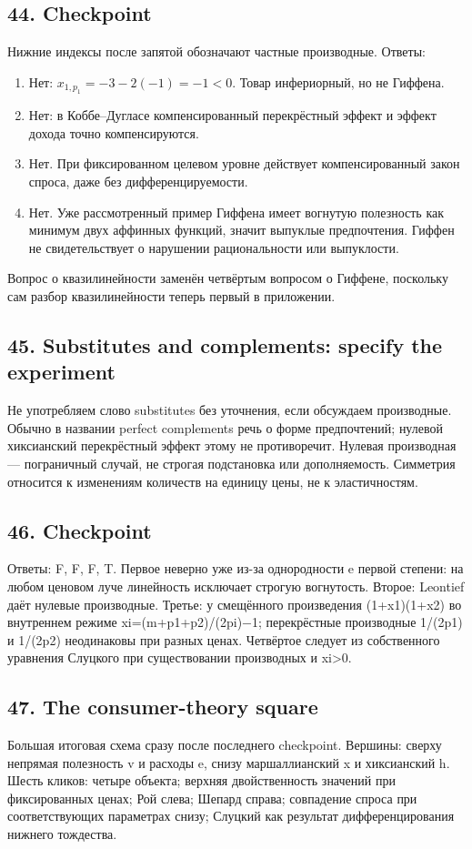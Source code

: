 \documentclass[11pt,a4paper]{article}
\begin{document}
\subsection*{44. Checkpoint}
Нижние индексы после запятой обозначают частные производные. Ответы:
\begin{enumerate}
\item Нет: $x_{1,p_1}=-3-2(-1)=-1<0$. Товар инфериорный, но не Гиффена.
\item Нет: в Коббе--Дугласе компенсированный перекрёстный эффект и эффект дохода точно компенсируются.
\item Нет. При фиксированном целевом уровне действует компенсированный закон спроса, даже без дифференцируемости.
\item Нет. Уже рассмотренный пример Гиффена имеет вогнутую полезность как минимум двух аффинных функций, значит выпуклые предпочтения. Гиффен не свидетельствует о нарушении рациональности или выпуклости.
\end{enumerate}
Вопрос о квазилинейности заменён четвёртым вопросом о Гиффене, поскольку сам разбор квазилинейности теперь первый в приложении.

\subsection*{45. Substitutes and complements: specify the experiment}
Не употребляем слово substitutes без уточнения, если обсуждаем производные. Обычно в названии perfect complements речь о форме предпочтений; нулевой хиксианский перекрёстный эффект этому не противоречит. Нулевая производная — пограничный случай, не строгая подстановка или дополняемость. Симметрия относится к изменениям количеств на единицу цены, не к эластичностям.

\subsection*{46. Checkpoint}
Ответы: F, F, F, T. Первое неверно уже из-за однородности e первой степени: на любом ценовом луче линейность исключает строгую вогнутость. Второе: Leontief даёт нулевые производные. Третье: у смещённого произведения (1+x1)(1+x2) во внутреннем режиме xi=(m+p1+p2)/(2pi)−1; перекрёстные производные 1/(2p1) и 1/(2p2) неодинаковы при разных ценах. Четвёртое следует из собственного уравнения Слуцкого при существовании производных и xi>0.

\subsection*{47. The consumer-theory square}
Большая итоговая схема сразу после последнего checkpoint. Вершины: сверху непрямая полезность v и расходы e, снизу маршаллианский x и хиксианский h. Шесть кликов: четыре объекта; верхняя двойственность значений при фиксированных ценах; Рой слева; Шепард справа; совпадение спроса при соответствующих параметрах снизу; Слуцкий как результат дифференцирования нижнего тождества.
\end{document}
